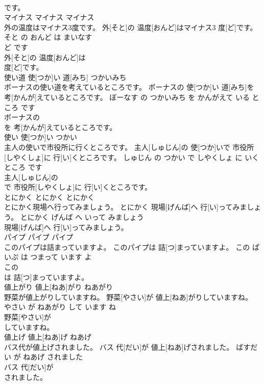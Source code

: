 \documentclass[8pt]{extreport}
\begin{document}
\begin{CJK}{UTF8}{min}
\\	です。			
\\	マイナス	マイナス	マイナス	
\\	外の温度はマイナス3度です。	外[そと]の 温度[おんど]はマイナス3 度[ど]です。	そと の おんど は まいなす 
\\	ど です	
\\	外[そと]の 温度[おんど]は
\\	度[ど]です。			
\\	使い道	使[つか]い 道[みち]	つかいみち	
\\	ボーナスの使い道を考えているところです。	ボーナスの 使[つか]い 道[みち]を 考[かんが]えているところです。	ぼーなす の つかいみち を かんがえて いる ところ です	
\\	ボーナスの
\\	を 考[かんが]えているところです。			
\\	使い	使[つか]い	つかい	
\\	主人の使いで市役所に行くところです。	主人[しゅじん]の 使[つか]いで 市役所[しやくしょ]に 行[い]くところです。	しゅじん の つかい で しやくしょ に いく ところ です	
\\	主人[しゅじん]の
\\	で 市役所[しやくしょ]に 行[い]くところです。			
\\	とにかく	とにかく	とにかく	
\\	とにかく現場へ行ってみましょう。	とにかく 現場[げんば]へ 行[い]ってみましょう。	とにかく げんば へ いって みましょう	
\\	現場[げんば]へ 行[い]ってみましょう。			
\\	パイプ	パイプ	パイプ	
\\	このパイプは詰まっていますよ。	このパイプは 詰[つ]まっていますよ。	この ぱいぷ は つまって います よ	
\\	この
\\	は 詰[つ]まっていますよ。			
\\	値上がり	値上[ねあ]がり	ねあがり	
\\	野菜が値上がりしていますね。	野菜[やさい]が 値上[ねあ]がりしていますね。	やさい が ねあがり して います ね	
\\	野菜[やさい]が
\\	していますね。			
\\	値上げ	値上[ねあ]げ	ねあげ	
\\	バス代が値上げされました。	バス 代[だい]が 値上[ねあ]げされました。	ばすだい が ねあげ されました	
\\	バス 代[だい]が
\\	されました。			

\end{CJK}
\end{document}
